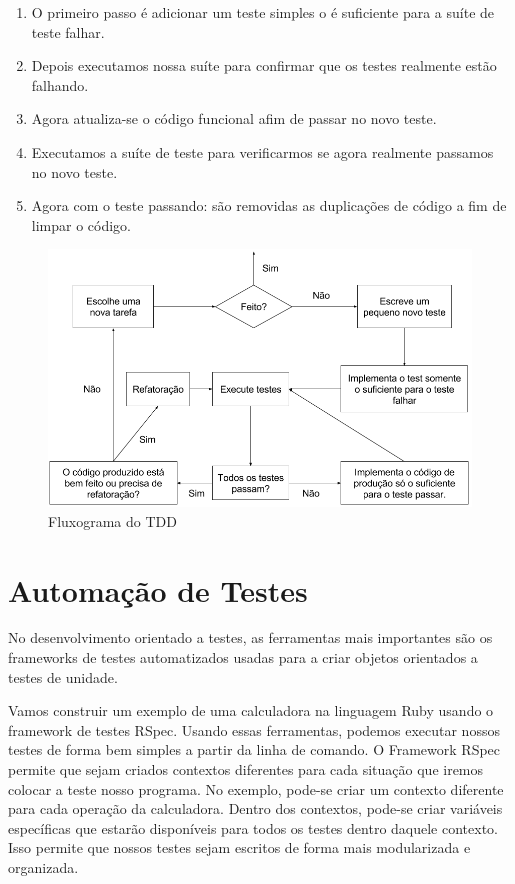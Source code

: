 \documentclass[12pt]{article}
\begin{document}
  \begin{enumerate}
    \item O primeiro passo é adicionar um teste simples o é suficiente 
    para a suíte de teste falhar.
    \item Depois executamos nossa suíte para confirmar que os testes realmente 
    estão falhando.
    \item Agora atualiza-se o código funcional afim de passar no novo teste.
    \item Executamos a suíte de teste para verificarmos se agora realmente 
    passamos no novo teste.
    \item Agora com o teste passando: são removidas as duplicações de código 
    a fim de limpar o código.
  \end{enumerate}

  \begin{figure}[H]
    \centering
    \includegraphics[scale=0.4]{tdd}
    \caption{Fluxograma do TDD}
  \end{figure}

  \section{Automação de Testes}

  No desenvolvimento orientado a testes, as ferramentas mais importantes são
  os frameworks de testes automatizados usadas para a criar objetos orientados
  a testes de unidade. 

  Vamos construir um exemplo de uma calculadora 
  na linguagem Ruby usando o framework de testes RSpec.
  Usando essas ferramentas, podemos executar nossos testes de forma bem simples a
  partir da linha de comando. O Framework RSpec permite que sejam criados contextos
  diferentes para cada situação que iremos colocar a teste nosso programa. No exemplo,
  pode-se criar um contexto diferente para cada operação da calculadora. Dentro dos
  contextos, pode-se criar variáveis específicas que estarão disponíveis para todos 
  os testes dentro daquele contexto. Isso permite que nossos testes sejam escritos de forma 
  mais modularizada e organizada.
\end{document}
